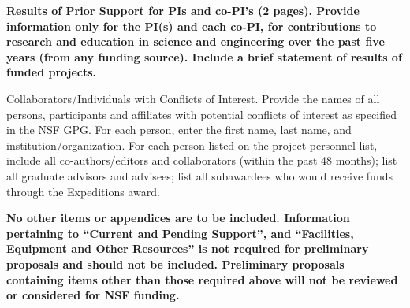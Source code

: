\documentclass [10pt]{article}
\begin{document}
\begin{outline}
\1 {\bf Results of Prior Support for PIs and co-PI's (2 pages).  Provide information only for the PI(s) and each co-PI, for contributions to research and education in science and engineering over the past five years (from any funding source).  Include a brief statement of results of funded projects.}

\1 Collaborators/Individuals with Conflicts of Interest.   Provide the names of all persons, participants and affiliates with potential conflicts of interest as specified in the NSF GPG. For each person, enter the first name, last name, and institution/organization.  For each person listed on the project personnel list, include all co-authors/editors and collaborators (within the past 48 months); list all graduate advisors and advisees; list all subawardees who would receive funds through the Expeditions award. 

\1 {\bf No other items or appendices are to be included. Information pertaining to ``Current and Pending Support'', and ``Facilities, Equipment and Other Resources'' is not required for preliminary proposals and should not be included. Preliminary proposals containing items other than those required above will not be reviewed or considered for NSF funding.}



\end{outline}
\end{document}
